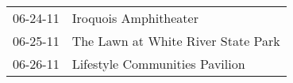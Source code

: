 \begin{supertabular}{p{0.07\textwidth}p{0.23\textwidth}}
 06-24-11 &               Iroquois Amphitheater \\
 06-25-11 &  The Lawn at White River State Park \\
 06-26-11 &      Lifestyle Communities Pavilion \\
\end{supertabular}
